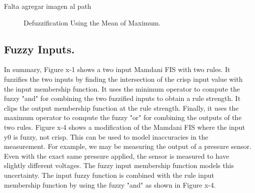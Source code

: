 \begin{enumerate}
Falta agregar imagen al path
\begin{figure}
\captionsetup{justification=centering,margin=2cm}
\centering
\setlength\fboxsep{0pt}
\setlength\fboxrule{0.7pt}
\caption{Defuzzification Using the Mean of Maximum.}
\label{fig:mean}
\end{figure}

\end{enumerate}

\subsection{Fuzzy Inputs.}
In summary, Figure x-1 shows a two input Mamdani FIS
with two rules. It fuzzifies the two inputs by finding the intersection of the
crisp input value with the input membership function. It uses the minimum
operator to compute the fuzzy "and" for combining the two fuzzified inputs to
obtain a rule strength. It clips the output membership function at the rule
strength. Finally, it uses the maximum operator to compute the fuzzy "or" for
combining the outputs of the two rules. Figure x-4 shows a modification of the
Mamdani FIS where the input y0 is fuzzy, not crisp. This can be used to model
inaccuracies in the measurement. For example, we may be measuring the output of
a pressure sensor. Even with the exact same pressure applied, the sensor is
measured to have slightly different voltages. The fuzzy input membership
function models this uncertainty. The input fuzzy function is combined with the
rule input membership function by using the fuzzy "and" as shown in Figure x-4.

